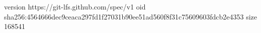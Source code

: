 version https://git-lfs.github.com/spec/v1
oid sha256:4564666dec9ceaca297fd1f27031b90ee51ad560f8f31c75609603fdcb2e4353
size 168541
